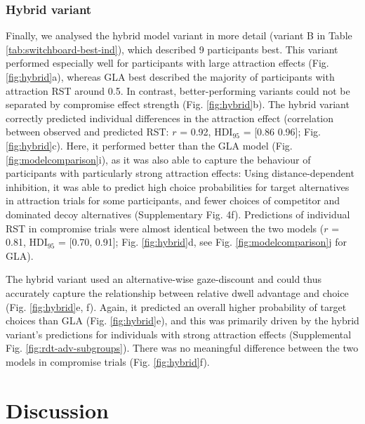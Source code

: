 \documentclass[11pt, a4paper]{article}
\begin{document}
\subsubsection*{Hybrid variant}

Finally, we analysed the hybrid model variant in more detail (variant B in Table \ref{tab:switchboard-best-ind}), which described 9 participants best. This variant performed especially well for participants with large attraction effects (Fig. \ref{fig:hybrid}a), whereas GLA best described the majority of participants with attraction RST around 0.5. In contrast, better-performing variants could not be separated by compromise effect strength (Fig. \ref{fig:hybrid}b). The hybrid variant correctly predicted individual differences in the attraction effect (correlation between observed and predicted RST: $r$ = 0.92, HDI$_{95}$ = [0.86 0.96]; Fig. \ref{fig:hybrid}c). Here, it performed better than the GLA model (Fig. \ref{fig:modelcomparison}i), as it was also able to capture the behaviour of participants with particularly strong attraction effects: Using distance-dependent inhibition, it was able to predict high choice probabilities for target alternatives in attraction trials for some participants, and fewer choices of competitor and dominated decoy alternatives (Supplementary Fig. 4f). Predictions of individual RST in compromise trials were almost identical between the two models ($r$ = 0.81, HDI$_{95}$ = [0.70, 0.91]; Fig. \ref{fig:hybrid}d, see Fig. \ref{fig:modelcomparison}j for GLA). 

The hybrid variant used an alternative-wise gaze-discount and could thus accurately capture the relationship between relative dwell advantage and choice (Fig. \ref{fig:hybrid}e, f). Again, it predicted an overall higher probability of target choices than GLA (Fig. \ref{fig:hybrid}e), and this was primarily driven by the hybrid variant’s predictions for individuals with strong attraction effects (Supplemental Fig. \ref{fig:rdt-adv-subgroups}). There was no meaningful difference between the two models in compromise trials (Fig. \ref{fig:hybrid}f).

\section*{Discussion}
\end{document}

